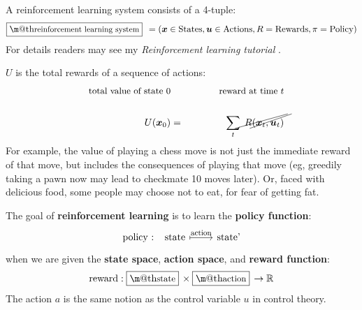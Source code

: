 \documentclass[orivec]{llncs}
\makeatletter
\newcommand{\emp}[1]{\textbf{#1}}
\newcommand{\tikzmark}[1]{\tikz[overlay,remember picture] \node (#1) {};}
\newcommand{\vect}[1]{\boldsymbol{#1}}
\renewcommand{\boxed}[1]{\fbox{\m@th$\displaystyle\scalebox{0.9}{#1}$} \,}
\makeatother
\begin{document}
A reinforcement learning system consists of a 4-tuple:
\begin{equation}
\boxed{\mbox{reinforcement learning system}} \; = (\vect{x} \in \mbox{States}, \vect{u} \in \mbox{Actions}, R = \mbox{Rewards}, \pi = \mbox{Policy})
\end{equation}
For details readers may see my \textit{Reinforcement learning tutorial} \cite{YanRLtutorialEN}.


$U$ is the total rewards of a sequence of actions:
\begin{eqnarray}
\mbox{\footnotesize total value of state 0} \tikzmark{uu} & \quad \quad \quad & \mbox{\footnotesize reward at time $t$} \tikzmark{rr} \nonumber \\
\nonumber \\
\tikzmark{UU} U(\vect{x}_0) & = & \sum_t \; \tikzmark{RR} R(\vect{x}_t, \vect{u}_t)
\begin{tikzpicture}[overlay,remember picture]
  \draw (uu.center) +(-50pt,-3pt) -- ([shift={(4pt,12pt)}]UU.center);
  \draw (rr.center) +(-35pt,-3pt) -- ([shift={(8pt,12pt)}]RR.center);
\end{tikzpicture}
\end{eqnarray}
For example, the value of playing a chess move is not just the immediate reward of that move, but includes the consequences of playing that move (eg, greedily taking a pawn now may lead to checkmate 10 moves later).  Or, faced with delicious food, some people may choose not to eat, for fear of getting fat.

The goal of \textbf{reinforcement learning} is to learn the \emp{policy function}:
\begin{equation}
\begin{tikzcd}[]
\mbox{policy : ~~state} \arrow[r, mapsto, "\scalebox{0.8}{action}"] & \mbox{state'}
\end{tikzcd}
\end{equation}
when we are given the \emp{state space}, \emp{action space}, and \emp{reward function}:
\begin{equation}
\mbox{reward}: \boxed{\mbox{state}} \times \boxed{\mbox{action}} \rightarrow \mathbb{R}
\end{equation}
The action $a$ is the same notion as the control variable $u$ in control theory.
\end{document}
